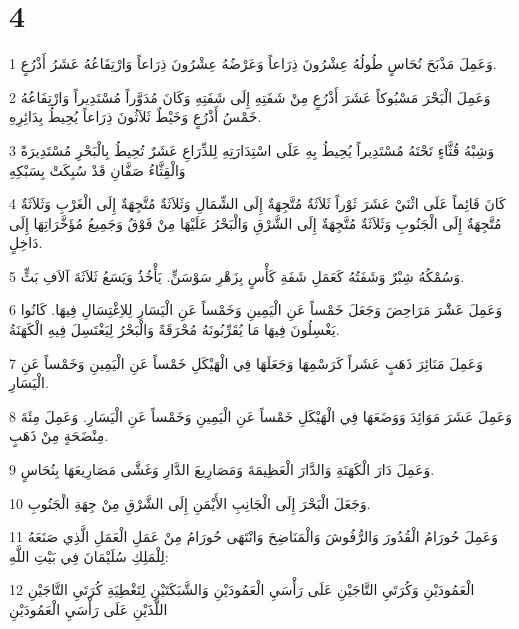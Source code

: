 \chapter{4}

\par 1 وَعَمِلَ مَذْبَحَ نُحَاسٍ طُولُهُ عِشْرُونَ ذِرَاعاً وَعَرْضُهُ عِشْرُونَ ذِرَاعاً وَارْتِفَاعُهُ عَشَرُ أَذْرُعٍ.
\par 2 وَعَمِلَ الْبَحْرَ مَسْبُوكاً عَشَرَ أَذْرُعٍ مِنْ شَفَتِهِ إِلَى شَفَتِهِ وَكَانَ مُدَوَّراً مُسْتَدِيراً وَارْتِفَاعُهُ خَمْسُ أَذْرُعٍ وَخَيْطٌ ثَلاَثُونَ ذِرَاعاً يُحِيطُ بِدَائِرِهِ.
\par 3 وَشِبْهُ قُثَّاءٍ تَحْتَهُ مُسْتَدِيراً يُحِيطُ بِهِ عَلَى اسْتِدَارَتِهِ لِلذِّرَاعِ عَشَرٌ تُحِيطُ بِالْبَحْرِ مُسْتَدِيرَةً وَالْقِثَّاءُ صَفَّانِ قَدْ سُبِكَتْ بِسَبْكِهِ
\par 4 كَانَ قَائِماً عَلَى اثْنَيْ عَشَرَ ثَوْراً ثَلاَثَةٌ مُتَّجِهَةٌ إِلَى الشِّمَالِ وَثَلاَثَةٌ مُتَّجِهَةٌ إِلَى الْغَرْبِ وَثَلاَثَةٌ مُتَّجِهَةٌ إِلَى الْجَنُوبِ وَثَلاَثَةٌ مُتَّجِهَةٌ إِلَى الشَّرْقِ وَالْبَحْرُ عَلَيْهَا مِنْ فَوْقُ وَجَمِيعُ مُؤَخَّرَاتِهَا إِلَى دَاخِلٍ.
\par 5 وَسُمْكُهُ شِبْرٌ وَشَفَتُهُ كَعَمَلِ شَفَةِ كَأْسٍ بِزَهْرِ سَوْسَنٍّ. يَأْخُذُ وَيَسَعُ ثَلاَثَةَ آلاَفِ بَثٍّ.
\par 6 وَعَمِلَ عَشَْرَ مَرَاحِضَ وَجَعَلَ خَمْساً عَنِ الْيَمِينِ وَخَمْساً عَنِ الْيَسَارِ لِلاِغْتِسَالِ فِيهَا. كَانُوا يَغْسِلُونَ فِيهَا مَا يُقَرِّبُونَهُ مُحْرَقَةً وَالْبَحْرُ لِيَغْتَسِلَ فِيهِ الْكَهَنَةُ.
\par 7 وَعَمِلَ مَنَائِرَ ذَهَبٍ عَشَراً كَرَسْمِهَا وَجَعَلَهَا فِي الْهَيْكَلِ خَمْساً عَنِ الْيَمِينِ وَخَمْساً عَنِ الْيَسَارِ.
\par 8 وَعَمِلَ عَشَرَ مَوَائِدَ وَوَضَعَهَا فِي الْهَيْكَلِ خَمْساً عَنِ الْيَمِينِ وَخَمْساً عَنِ الْيَسَارِ. وَعَمِلَ مِئَةَ مِنْضَحَةٍ مِنْ ذَهَبٍ.
\par 9 وَعَمِلَ دَارَ الْكَهَنَةِ وَالدَّارَ الْعَظِيمَةَ وَمَصَارِيعَ الدَّارِ وَغَشَّى مَصَارِيعَهَا بِنُحَاسٍ.
\par 10 وَجَعَلَ الْبَحْرَ إِلَى الْجَانِبِ الأَيْمَنِ إِلَى الشَّرْقِ مِنْ جِهَةِ الْجَنُوبِ.
\par 11 وَعَمِلَ حُورَامُ الْقُدُورَ وَالرُّفُوشَ وَالْمَنَاضِحَ وَانْتَهَى حُورَامُ مِنْ عَمَلِ الْعَمَلِ الَّذِي صَنَعَهُ لِلْمَلِكِ سُلَيْمَانَ فِي بَيْتِ اللَّهِ:
\par 12 الْعَمُودَيْنِ وَكُرَتَيِ التَّاجَيْنِ عَلَى رَأْسَيِ الْعَمُودَيْنِ وَالشَّبَكَتَيْنِ لِتَغْطِيَةِ كُرَتَيِ التَّاجَيْنِ اللَّذَيْنِ عَلَى رَأْسَيِ الْعَمُودَيْنِ
